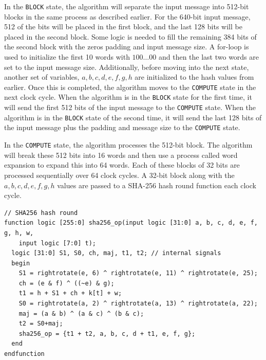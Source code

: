 \documentclass{article}
\begin{document}
In the \verb|BLOCK| state, the algorithm will separate the input message into 512-bit blocks in the same process as described earlier. For the 640-bit input message, 512 of the bits will be placed in the first block, and the last 128 bits will be placed in the second block. Some logic is needed to fill the remaining 384 bits of the second block with the zeros padding and input message size. A for-loop is used to initialize the first 10 words with $100\dots00$ and then the last two words are set to the input message size. Additionally, before moving into the next state, another set of variables, $a,b,c,d,e,f,g,h$ are initialized to the hash values from earlier. Once this is completed, the algorithm moves to the \verb|COMPUTE| state in the next clock cycle. When the algorithm is in the \verb|BLOCK| state for the first time, it will send the first 512 bits of the input message to the \verb|COMPUTE| state. When the algorithm is in the \verb|BLOCK| state of the second time, it will send the last 128 bits of the input message plus the padding and message size to the \verb|COMPUTE| state.

In the \verb|COMPUTE| state, the algorithm processes the 512-bit block. The algorithm will break these 512 bits into 16 words and then use a process called word expansion to expand this into 64 words. Each of these blocks of 32 bits are processed sequentially over 64 clock cycles. A 32-bit block along with the $a,b,c,d,e,f,g,h$ values are passed to a SHA-256 hash round function each clock cycle.

\begin{lstlisting}[style=verilog-style]
// SHA256 hash round
function logic [255:0] sha256_op(input logic [31:0] a, b, c, d, e, f, g, h, w,
    input logic [7:0] t);
  logic [31:0] S1, S0, ch, maj, t1, t2; // internal signals
  begin
    S1 = rightrotate(e, 6) ^ rightrotate(e, 11) ^ rightrotate(e, 25);
    ch = (e & f) ^ ((~e) & g);
    t1 = h + S1 + ch + k[t] + w;
    S0 = rightrotate(a, 2) ^ rightrotate(a, 13) ^ rightrotate(a, 22);
    maj = (a & b) ^ (a & c) ^ (b & c);
    t2 = S0+maj;
    sha256_op = {t1 + t2, a, b, c, d + t1, e, f, g};
  end
endfunction
\end{lstlisting}
\end{document}
